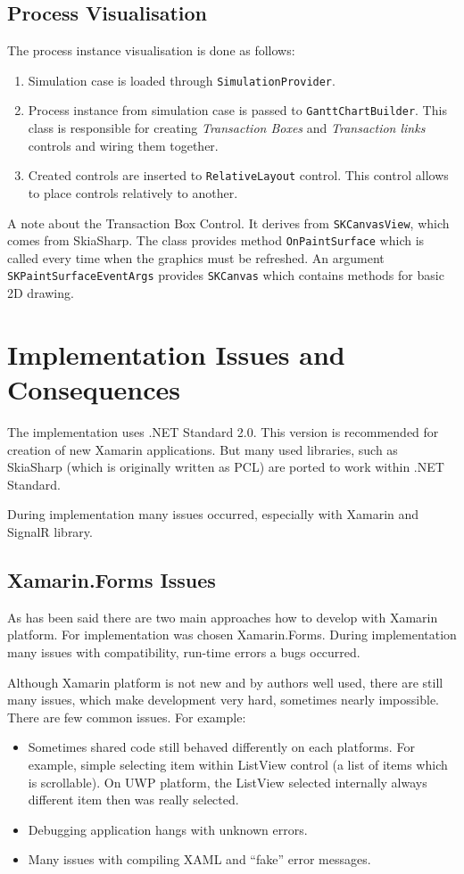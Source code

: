 \subsection{Process Visualisation}
The process instance visualisation is done as follows:
\begin{enumerate}
\item Simulation case is loaded through \texttt{SimulationProvider}.
\item Process instance from simulation case is passed to \texttt{GanttChartBuilder}. This class is responsible for creating \textit{Transaction Boxes} and \textit{Transaction links} controls and wiring them together.
\item Created controls are inserted to \texttt{RelativeLayout} control. This control allows to place controls relatively to another. 
\end{enumerate}

A note about the Transaction Box Control. It derives from \texttt{SKCanvasView}, which comes from SkiaSharp. The class provides method \texttt{OnPaintSurface} which is called every time when the graphics must be refreshed. An argument \texttt{SKPaintSurfaceEventArgs} provides \texttt{SKCanvas} which contains methods for basic 2D drawing. 
\section{Implementation Issues and Consequences}
The implementation uses .NET Standard 2.0. This version is recommended for creation of new Xamarin applications. But many used libraries, such as SkiaSharp (which is originally written as PCL) are ported to work within .NET Standard.

During implementation many issues occurred, especially with Xamarin and SignalR library.
\subsection{Xamarin.Forms Issues}
As has been said there are two main approaches how to develop with Xamarin platform. For implementation was chosen Xamarin.Forms. During implementation many issues with compatibility, run-time errors a bugs occurred. 

Although Xamarin platform is not new and by authors well used, there are still many issues, which make development very hard, sometimes nearly impossible. There are few common issues. For example:
\begin{itemize}
\item Sometimes shared code still behaved differently on each platforms. For example, simple selecting item within ListView control (a list of items which is scrollable). On UWP platform, the ListView selected internally always different item then was really selected. 
\item Debugging application hangs with unknown errors.
\item Many issues with compiling XAML and ``fake'' error messages. 
\end{itemize}

